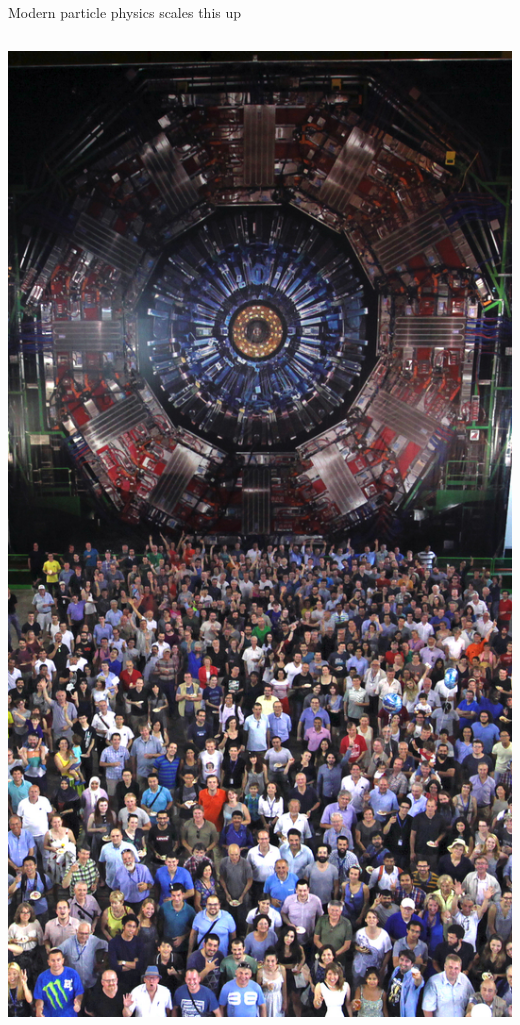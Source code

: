 \documentclass[aspectratio=169]{beamer}
\begin{document}
\begin{frame}{Modern particle physics scales this up}
\begin{columns}
\includegraphics[width=\linewidth]{cms25_2.jpg}
\end{columns}
\end{frame}
\end{document}
